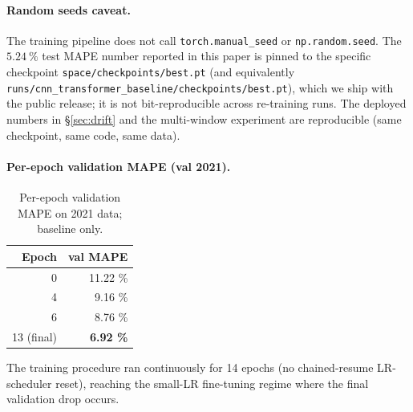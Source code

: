 \paragraph{Random seeds caveat.}
The training pipeline does not call \texttt{torch.manual\_seed} or
\texttt{np.random.seed}. The $5.24~\%$ test MAPE number reported in this
paper is pinned to the specific checkpoint
\texttt{space/checkpoints/best.pt} (and equivalently
\texttt{runs/cnn\_transformer\_baseline/checkpoints/best.pt}), which
we ship with the public release; it is not bit-reproducible across
re-training runs. The deployed numbers in §\ref{sec:drift} and the
multi-window experiment are reproducible (same checkpoint, same code,
same data).

\paragraph{Per-epoch validation MAPE (val 2021).}

\begin{table}[h]
\centering\small
\caption{Per-epoch validation MAPE on 2021 data; baseline only.}
\label{tab:trajectory}
\begin{tabular}{@{}rr@{}}
\toprule
Epoch & val MAPE \\
\midrule
0 & 11.22 \% \\
4 & 9.16 \%  \\
6 & 8.76 \%  \\
13 (final) & \textbf{6.92 \%} \\
\bottomrule
\end{tabular}
\end{table}

The training procedure ran continuously for 14 epochs (no chained-resume
LR-scheduler reset), reaching the small-LR fine-tuning regime where the
final validation drop occurs.
